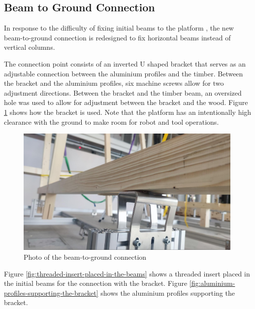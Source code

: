 \subsection{Beam to Ground Connection}
\label{subsection:exploration-4-beam-to-ground-connection}

In response to the difficulty of fixing initial beams to the platform , the new beam-to-ground connection is redesigned to fix horizontal beams instead of vertical columns. 

The connection point consists of an inverted U shaped bracket that serves as an adjustable connection between the aluminium profiles and the timber. Between the bracket and the aluminium profiles, six machine screws allow for two adjustment directions. Between the bracket and the timber beam, an oversized hole was used to allow for adjustment between the bracket and the wood. Figure \ref{fig:beam-to-ground-connection} shows how the bracket is used. Note that the platform has an intentionally high clearance with the ground to make room for robot and tool operations.

\begin{figure}[!h]
    \centering
    \includegraphics[width=0.99\textwidth]{images/7a/img60.jpg}
    \caption{Photo of the beam-to-ground connection}
    \label{fig:beam-to-ground-connection}
\end{figure}


Figure \ref{fig:threaded-insert-placed-in-the-beams} shows a threaded insert placed in the initial beams for the connection with the bracket. Figure \ref{fig:aluminium-profiles-supporting-the-bracket} shows the aluminium profiles supporting the bracket.

